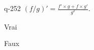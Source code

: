 \begin{truefalse}{q-252}
$(f / g)' = \frac{f'\times g + f\times g'}{g^2}$.
\item Vrai
\item* Faux
\end{truefalse}

